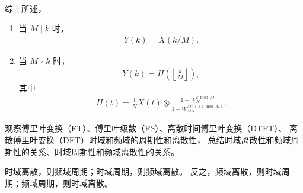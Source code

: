 \begin{solution}
\begin{enumerate}[label=(\arabic*)]
\begin{enumerate}
\begin{align*}
                    \end{align*}
            \end{enumerate}
            综上所述，
            \begin{enumerate}
                \item 当 $M \mid k$ 时，
                    \begin{align*}
                        Y(k) = X(k / M).
                    \end{align*}
                \item 当 $M \nmid k$ 时，
                    \begin{align*}
                        Y(k) = H\left(\left\lfloor\frac{k}{M}\right\rfloor\right),
                    \end{align*}
                    其中
                    \begin{align*}
                        H(t) = \frac{1}{N}X(t) \otimes \frac{1 - W_N^{k \bmod M}}{1 - W_{MN}^{Mt + (k\bmod M)}}.
                    \end{align*}
            \end{enumerate}
    \end{enumerate}
\end{solution}

\begin{exercise}
    观察傅里叶变换（FT）、傅里叶级数（FS）、离散时间傅里叶变换（DTFT）、
    离散傅里叶变换（DFT）时域和频域的周期性和离散性，
    总结时域离散性和频域周期性的关系、时域周期性和频域离散性的关系。
\end{exercise}

\begin{solution}
    时域离散，则频域周期；时域周期，则频域离散。
    反之，频域离散，则时域周期；频域周期，则时域离散。
\end{solution}
